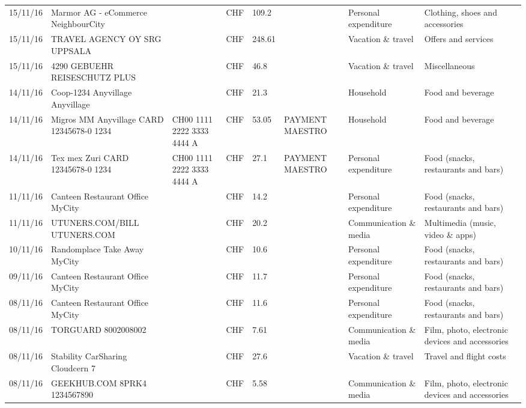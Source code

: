 \begin{landscape}
\begin{tiny}
\begin{longtable}{lp{4cm}llllp{3cm}ll}
		    15/11/16 & Marmor AG - eCommerce     NeighbourCity &       & CHF   & 109.2 &       & Personal expenditure & Clothing, shoes and accessories \\
		    15/11/16 & TRAVEL AGENCY OY SRG     UPPSALA &       & CHF   & 248.61 &       & Vacation \& travel & Offers and services \\
		    15/11/16 & 4290 GEBUEHR REISESCHUTZ PLUS &       & CHF   & 46.8  &       & Vacation \& travel & Miscellaneous \\
		    14/11/16 & Coop-1234 Anyvillage    Anyvillage &       & CHF   & 21.3  &       & Household & Food and beverage \\
		    14/11/16 & Migros MM Anyvillage CARD 12345678-0 1234 & CH00 1111 2222 3333 4444 A & CHF   & 53.05 & PAYMENT MAESTRO & Household & Food and beverage \\
		    14/11/16 & Tex mex Zuri CARD 12345678-0 1234 & CH00 1111 2222 3333 4444 A & CHF   & 27.1  & PAYMENT MAESTRO & Personal expenditure & Food (snacks, restaurants and bars) \\
		    11/11/16 & Canteen Restaurant Office      MyCity &       & CHF   & 14.2  &       & Personal expenditure & Food (snacks, restaurants and bars) \\
		    11/11/16 & UTUNERS.COM/BILL          UTUNERS.COM &       & CHF   & 20.2  &       & Communication \& media & Multimedia (music, video \& apps) \\
		    10/11/16 & Randomplace Take Away     MyCity &       & CHF   & 10.6  &       & Personal expenditure & Food (snacks, restaurants and bars) \\
		    09/11/16 & Canteen Restaurant Office      MyCity &       & CHF   & 11.7  &       & Personal expenditure & Food (snacks, restaurants and bars) \\
		    08/11/16 & Canteen Restaurant Office      MyCity &       & CHF   & 11.6  &       & Personal expenditure & Food (snacks, restaurants and bars) \\
		    08/11/16 & TORGUARD                 8002008002 &       & CHF   & 7.61  &       & Communication \& media & Film, photo, electronic devices and accessories \\
		    08/11/16 & Stability CarSharing      Cloudcern 7 &       & CHF   & 27.6  &       & Vacation \& travel & Travel and flight costs \\
		    08/11/16 & GEEKHUB.COM  8PRK4        1234567890 &       & CHF   & 5.58  &       & Communication \& media & Film, photo, electronic devices and accessories \\

\end{longtable}
\end{tiny}
\end{landscape}

